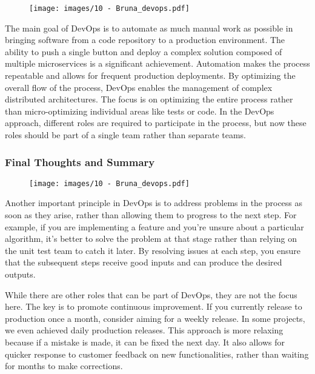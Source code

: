 \begin{figure}[!h]
  \centering
  \texttt{[image: images/10 - Bruna\_devops.pdf]}
\end{figure}

The main goal of DevOps is to automate as much manual work as possible
in bringing software from a code repository to a production environment.
The ability to push a single button and deploy a complex solution
composed of multiple microservices is a significant achievement.
Automation makes the process repeatable and allows for frequent
production deployments. By optimizing the overall flow of the process,
DevOps enables the management of complex distributed architectures. The
focus is on optimizing the entire process rather than micro-optimizing
individual areas like tests or code. In the DevOps approach, different
roles are required to participate in the process, but now these roles
should be part of a single team rather than separate teams.

\subsubsection{Final Thoughts and Summary}

\begin{figure}[!h]
  \centering
  \texttt{[image: images/10 - Bruna\_devops.pdf]}
\end{figure}

Another important principle in DevOps is to address problems in the
process as soon as they arise, rather than allowing them to progress to
the next step. For example, if you are implementing a feature and you're
unsure about a particular algorithm, it's better to solve the problem at
that stage rather than relying on the unit test team to catch it later.
By resolving issues at each step, you ensure that the subsequent steps
receive good inputs and can produce the desired outputs.

While there are other roles that can be part of DevOps, they are not the
focus here. The key is to promote continuous improvement. If you
currently release to production once a month, consider aiming for a
weekly release. In some projects, we even achieved daily production
releases. This approach is more relaxing because if a mistake is made,
it can be fixed the next day. It also allows for quicker response to
customer feedback on new functionalities, rather than waiting for months
to make corrections.

